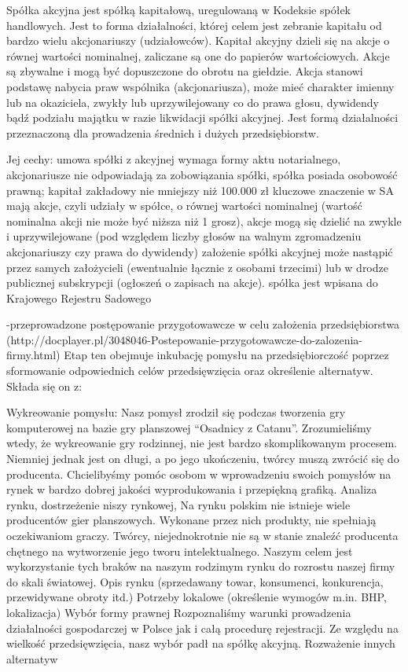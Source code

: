 \documentclass[a4paper, 11pt]{article}
\begin{document}

	Spółka akcyjna jest spółką kapitałową, uregulowaną w Kodeksie spółek handlowych. Jest to forma działalności, której celem jest zebranie kapitału od bardzo wielu akcjonariuszy (udziałowców).  Kapitał akcyjny dzieli się na akcje o równej wartości nominalnej, zaliczane są one do papierów wartościowych. Akcje są zbywalne i mogą być dopuszczone do obrotu na giełdzie. Akcja stanowi podstawę nabycia praw wspólnika (akcjonariusza), może mieć charakter imienny lub na okaziciela, zwykły lub uprzywilejowany co do prawa głosu, dywidendy bądź podziału majątku w razie likwidacji spółki akcyjnej. Jest formą działalności przeznaczoną dla prowadzenia średnich i dużych przedsiębiorstw. 

Jej cechy:%
umowa spółki z akcyjnej wymaga formy aktu notarialnego,
akcjonariusze nie odpowiadają za zobowiązania spółki,
spółka posiada osobowość prawną;
kapitał zakładowy nie mniejszy niż 100.000 zł
kluczowe znaczenie w SA mają akcje, czyli udziały w spółce, o równej wartości nominalnej (wartość nominalna akcji nie może być niższa niż 1 grosz),
akcje mogą się dzielić na zwykle i uprzywilejowane (pod względem liczby głosów na walnym zgromadzeniu akcjonariuszy czy prawa do dywidendy)
założenie spółki akcyjnej może nastąpić przez samych założycieli (ewentualnie łącznie z osobami trzecimi) lub w drodze publicznej subskrypcji (ogłoszeń o zapisach na akcje).
spółka jest wpisana do Krajowego Rejestru Sadowego


-przeprowadzone postępowanie przygotowawcze w celu założenia przedsiębiorstwa 
(http://docplayer.pl/3048046-Postepowanie-przygotowawcze-do-zalozenia-firmy.html)
	Etap ten obejmuje inkubację pomysłu na przedsiębiorczość poprzez sformowanie odpowiednich celów przedsięwzięcia oraz określenie alternatyw. Składa się on z:

Wykreowanie pomysłu:
Nasz pomysł zrodził się podczas tworzenia gry komputerowej na bazie gry planszowej “Osadnicy z Catanu”. Zrozumieliśmy wtedy, że wykreowanie gry rodzinnej, nie jest bardzo skomplikowanym procesem. Niemniej jednak jest on długi, a po jego ukończeniu, twórcy muszą zwrócić się do producenta. Chcielibyśmy pomóc osobom w wprowadzeniu swoich pomysłów na rynek w bardzo dobrej jakości wyprodukowania i przepiękną grafiką.
Analiza rynku, dostrzeżenie niszy rynkowej,
Na rynku polskim nie istnieje wiele producentów gier planszowych. Wykonane przez nich produkty, nie spełniają oczekiwaniom graczy. Twórcy, niejednokrotnie nie są w stanie znaleźć producenta chętnego na wytworzenie jego tworu intelektualnego. Naszym celem jest wykorzystanie tych braków na naszym rodzimym rynku do rozrostu naszej firmy do skali światowej.
Opis rynku (sprzedawany towar, konsumenci, konkurencja, przewidywane obroty itd.)
Potrzeby lokalowe (określenie wymogów m.in. BHP, lokalizacja)
Wybór formy prawnej
Rozpoznaliśmy warunki prowadzenia działalności gospodarczej w Polsce jak i całą procedurę rejestracji. Ze względu na wielkość przedsięwzięcia, nasz wybór padł na spółkę akcyjną.
Rozważenie innych alternatyw
	
\end{document}
